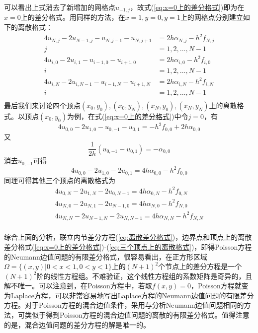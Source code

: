              可以看出上式消去了新增加的网格点$u_{-1,j}$，故式(\ref{eq:x=0上的差分格式})即为在$x=0$上的差分格式。用同样的方法，在$x=1,y=0,y=1$上的网格点分别建立如下的离散格式：
             \begin{equation}\label{eq:其他三个网格点上的离散格式}
             \begin{split}
            4{u_{N,j}} - 2{u_{N-1,j}} - {u_{N,j - 1}} - {u_{N,j + 1}} &= 2h{\alpha _{N,j}} - {h^2}{f_{N,j}}\\
            j &= 1,2,\ldots,N-1\\
            4{u_{i,0}} - 2{u_{i,1}} - {u_{i-1,0}} - {u_{i+1,0}} &= 2h{\alpha _{i,0}} - {h^2}{f_{i,0}}\\
            i &= 1,2,\ldots,N-1\\
            4{u_{i,N}} - 2{u_{i,N-1}} - {u_{i-1,N}} - {u_{i+1,N}} &= 2h{\alpha _{i,N}} - {h^2}{f_{i,N}}\\
            i &= 1,2,\ldots,N-1\\
             \end{split}
             \end{equation}
            最后我们来讨论四个顶点$(x_0,y_0),(x_0,y_N),(x_N,y_0),(x_N,y_N)$上的离散格式。以顶点$(x_0,y_0)$为例，在式(\ref{eq:x=0上的差分格式})中令$j=0$，有
             \[4{u_{0,0}} - 2{u_{1,0}} - {u_{0, - 1}} - {u_{0,1}} =  - {h^2}{f_{0,0}} + 2h{\alpha _{0,0}}\]
             又
             \[\frac{1}{{2h}}\left( {{u_{0, - 1}} - {u_{0,1}}} \right) =  - {\alpha _{0,0}}\]
             消去$u_{0,-1}$可得
            \begin{equation}
             4{u_{0,0}} - 2{u_{1,0}} - 2{u_{0,1}} = 4h{\alpha _{0,0}} - {h^2}{f_{0,0}}
            \end{equation}
            同理可得其他三个顶点的离散格式为
            \begin{equation}\label{eq:三个顶点上的离散格式}
            \begin{split}
            4{u_{0,N}} - 2{u_{1,N}} - 2{u_{0,N - 1}} = 4h{\alpha _{0,N}} - {h^2}{f_{0,N}}\\
            4{u_{N,0}} - 2{u_{N,1}} - 2{u_{N - 1,0}} = 4h{\alpha _{N,0}} - {h^2}{f_{N,0}}\\
            4{u_{N,N}} - 2{u_{N-1,N}} - 2{u_{N,N - 1}} = 4h{\alpha _{N,N}} - {h^2}{f_{N,N}}\\
            \end{split}
            \end{equation}
            \par
            综合上面的分析，联立内节差分方程(\ref{eq:离散差分格式})，边界点和顶点上的离散差分格式(\ref{eq:x=0上的差分格式})-(\ref{eq:三个顶点上的离散格式})，即得Poisson方程的Neumann边值问题的有限差分格式，很容易看出，在正方形区域$\Omega=\{(x,y)|0<x<1,0<y<1\}$上的$(N+1)^2$个节点上的差分方程是一个$(N+1)^2$阶的线性方程组。不难验证，这个线性方程组的系数矩阵是奇异的，且解不唯一。可以注意到，在Poisson方程中，若取$f(x,y)=0$，Poisson方程就变为Laplace方程，可以非常容易地写出Laplace方程的Neumann边值问题的有限差分方程。对于Poisson方程的混合边值条件，采用与分析Neumann边值问题相同的方法，可类似于得到Poisson方程的混合边值问题的离散的有限差分格式。值得注意的是，混合边值问题的差分方程的解是唯一的。

